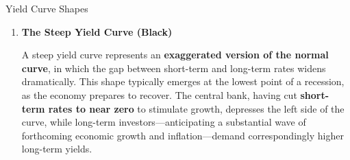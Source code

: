\documentclass[10pt]{article}
\begin{document}
\begin{core}[label=core:yield_shape]{Yield Curve Shapes}
\begin{enumerate}
        \item \textbf{The Steep Yield Curve (Black)}

        A steep yield curve represents an \textbf{exaggerated version of the normal curve}, in which the gap between short-term and long-term rates widens dramatically. This shape typically emerges at the lowest point of a recession, as the economy prepares to recover. The central bank, having cut \textbf{short-term rates to near zero} to stimulate growth, depresses the left side of the curve, while long-term investors---anticipating a substantial wave of forthcoming economic growth and inflation---demand correspondingly higher long-term yields.

      \end{enumerate}

    \end{core}
\end{document}
